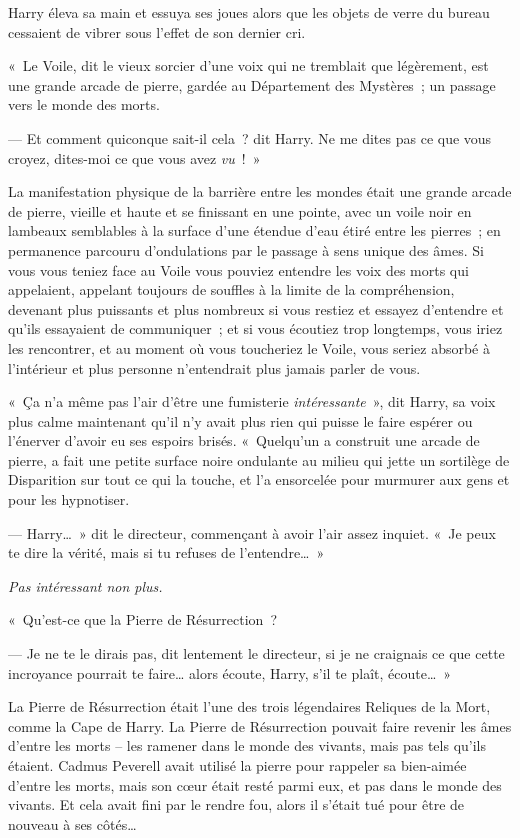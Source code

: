 Harry éleva sa main et essuya ses joues alors que les objets de verre du bureau cessaient de vibrer sous l'effet de son dernier cri.

«~Le Voile, dit le vieux sorcier d'une voix qui ne tremblait que légèrement, est une grande arcade de pierre, gardée au Département des Mystères~; un passage vers le monde des morts.

--- Et comment quiconque sait-il cela~? dit Harry.
Ne me dites pas ce que vous croyez, dites-moi ce que vous avez \emph{vu}~!~»

La manifestation physique de la barrière entre les mondes était une grande arcade de pierre, vieille et haute et se finissant en une pointe, avec un voile noir en lambeaux semblables à la surface d'une étendue d'eau étiré entre les pierres~; en permanence parcouru d'ondulations par le passage à sens unique des âmes.
Si vous vous teniez face au Voile vous pouviez entendre les voix des morts qui appelaient, appelant toujours de souffles à la limite de la compréhension, devenant plus puissants et plus nombreux si vous restiez et essayez d'entendre et qu'ils essayaient de communiquer~; et si vous écoutiez trop longtemps, vous iriez les rencontrer, et au moment où vous toucheriez le Voile, vous seriez absorbé à l'intérieur et plus personne n'entendrait plus jamais parler de vous.

«~Ça n'a même pas l'air d'être une fumisterie \emph{intéressante}~», dit Harry, sa voix plus calme maintenant qu'il n'y avait plus rien qui puisse le faire espérer ou l'énerver d'avoir eu ses espoirs brisés.
«~Quelqu'un a construit une arcade de pierre, a fait une petite surface noire ondulante au milieu qui jette un sortilège de Disparition sur tout ce qui la touche, et l'a ensorcelée pour murmurer aux gens et pour les hypnotiser.

--- Harry…~»
dit le directeur, commençant à avoir l'air assez inquiet.
«~Je peux te dire la vérité, mais si tu refuses de l'entendre…~»

\emph{Pas intéressant non plus.}

«~Qu'est-ce que la Pierre de Résurrection~?

--- Je ne te le dirais pas, dit lentement le directeur, si je ne craignais ce que cette incroyance pourrait te faire… alors écoute, Harry, s'il te plaît, écoute…~»

La Pierre de Résurrection était l'une des trois légendaires Reliques de la Mort, comme la Cape de Harry.
La Pierre de Résurrection pouvait faire revenir les âmes d'entre les morts -- les ramener dans le monde des vivants, mais pas tels qu'ils étaient.
Cadmus Peverell avait utilisé la pierre pour rappeler sa bien-aimée d'entre les morts, mais son cœur était resté parmi eux, et pas dans le monde des vivants.
Et cela avait fini par le rendre fou, alors il s'était tué pour être de nouveau à ses côtés…

